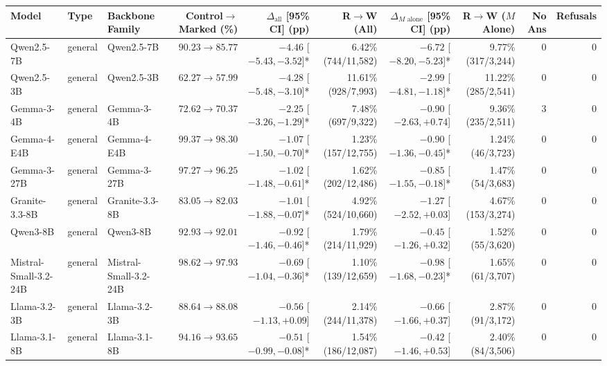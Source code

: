 \documentclass[11pt]{article}
\begin{document}
\begin{table}[t]
\centering
\scriptsize
\setlength{\tabcolsep}{3.6pt}
\begin{tabular}{@{}lllrrrrrrr@{}}
\toprule
\textbf{Model} & \textbf{Type} & \textbf{Backbone Family} & \textbf{Control$\to$Marked (\%)} & \textbf{$\Delta_{\text{all}}$ [95\% CI] (pp)} & \textbf{R$\to$W (All)} & \textbf{$\Delta_{M\text{ alone}}$ [95\% CI] (pp)} & \textbf{R$\to$W ($M$ Alone)} & \textbf{No Ans} & \textbf{Refusals} \\
\midrule
Qwen2.5-7B & general & Qwen2.5-7B & $90.23 \to 85.77$ & $-4.46$ [$-5.43, -3.52$]* & 6.42\% (744/11,582) & $-6.72$ [$-8.20, -5.23$]* & 9.77\% (317/3,244) & 0 & 0 \\
Qwen2.5-3B & general & Qwen2.5-3B & $62.27 \to 57.99$ & $-4.28$ [$-5.48, -3.10$]* & 11.61\% (928/7,993) & $-2.99$ [$-4.81, -1.18$]* & 11.22\% (285/2,541) & 0 & 0 \\
Gemma-3-4B & general & Gemma-3-4B & $72.62 \to 70.37$ & $-2.25$ [$-3.26, -1.29$]* & 7.48\% (697/9,322) & $-0.90$ [$-2.63, +0.74$]\phantom{*} & 9.36\% (235/2,511) & 3 & 0 \\
Gemma-4-E4B & general & Gemma-4-E4B & $99.37 \to 98.30$ & $-1.07$ [$-1.50, -0.70$]* & 1.23\% (157/12,755) & $-0.90$ [$-1.36, -0.45$]* & 1.24\% (46/3,723) & 0 & 0 \\
Gemma-3-27B & general & Gemma-3-27B & $97.27 \to 96.25$ & $-1.02$ [$-1.48, -0.61$]* & 1.62\% (202/12,486) & $-0.85$ [$-1.55, -0.18$]* & 1.47\% (54/3,683) & 0 & 0 \\
Granite-3.3-8B & general & Granite-3.3-8B & $83.05 \to 82.03$ & $-1.01$ [$-1.88, -0.07$]* & 4.92\% (524/10,660) & $-1.27$ [$-2.52, +0.03$]\phantom{*} & 4.67\% (153/3,274) & 0 & 0 \\
Qwen3-8B & general & Qwen3-8B & $92.93 \to 92.01$ & $-0.92$ [$-1.46, -0.46$]* & 1.79\% (214/11,929) & $-0.45$ [$-1.26, +0.32$]\phantom{*} & 1.52\% (55/3,620) & 0 & 0 \\
Mistral-Small-3.2-24B & general & Mistral-Small-3.2-24B & $98.62 \to 97.93$ & $-0.69$ [$-1.04, -0.36$]* & 1.10\% (139/12,659) & $-0.98$ [$-1.68, -0.23$]* & 1.65\% (61/3,707) & 0 & 0 \\
Llama-3.2-3B & general & Llama-3.2-3B & $88.64 \to 88.08$ & $-0.56$ [$-1.13, +0.09$]\phantom{*} & 2.14\% (244/11,378) & $-0.66$ [$-1.66, +0.37$]\phantom{*} & 2.87\% (91/3,172) & 0 & 0 \\
Llama-3.1-8B & general & Llama-3.1-8B & $94.16 \to 93.65$ & $-0.51$ [$-0.99, -0.08$]* & 1.54\% (186/12,087) & $-0.42$ [$-1.46, +0.53$]\phantom{*} & 2.40\% (84/3,506) & 0 & 0 \\

\end{tabular}
\end{table}
\end{document}
